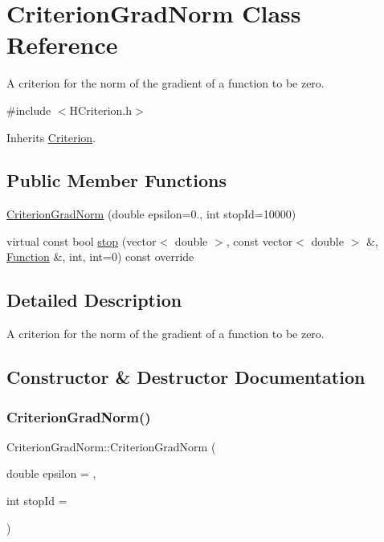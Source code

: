 \hypertarget{class_criterion_grad_norm}{}\section{Criterion\+Grad\+Norm Class Reference}
\label{class_criterion_grad_norm}


A criterion for the norm of the gradient of a function to be zero.  




{\ttfamily \#include $<$H\+Criterion.\+h$>$}



Inherits \hyperlink{class_criterion}{Criterion}.

\subsection*{Public Member Functions}
\begin{DoxyCompactItemize}
\item 
\hyperlink{class_criterion_grad_norm_ad8e18df4541ad1077d4b3a514f440e4f}{Criterion\+Grad\+Norm} (double epsilon=0., int stop\+Id=10000)
\item 
virtual const bool \hyperlink{class_criterion_grad_norm_aa482b08006d20c4aac09c0322feb3d6e}{stop} (vector$<$ double $>$, const vector$<$ double $>$ \&, \hyperlink{class_function}{Function} \&, int, int=0) const override
\end{DoxyCompactItemize}


\subsection{Detailed Description}
A criterion for the norm of the gradient of a function to be zero. 

\subsection{Constructor \& Destructor Documentation}
\mbox{\label{class_criterion_grad_norm_ad8e18df4541ad1077d4b3a514f440e4f}} 
\subsubsection{\texorpdfstring{Criterion\+Grad\+Norm()}{CriterionGradNorm()}}
{\footnotesize\ttfamily Criterion\+Grad\+Norm\+::\+Criterion\+Grad\+Norm (\begin{DoxyParamCaption}\item[{double}]{epsilon = {},  }\item[{int}]{stop\+Id = {} }\end{DoxyParamCaption})\hspace{0.3cm}{\ttfamily [inline]}}



